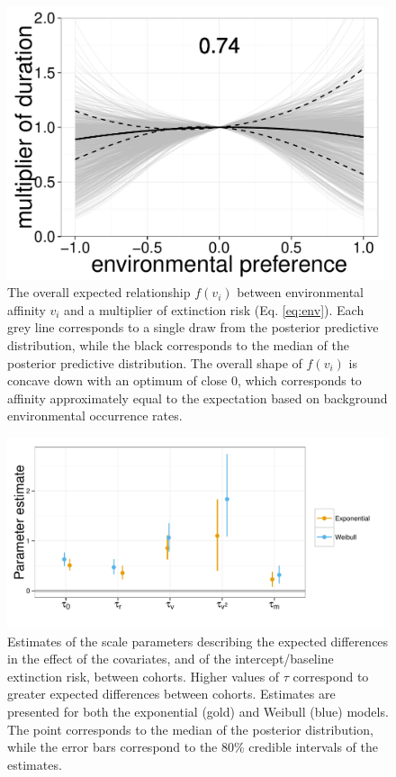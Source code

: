 \documentclass[12pt,letterpaper]{article}
\begin{document}
\begin{figure}[ht]
  \centering
  \includegraphics[height = 0.5\textheight,width=\textwidth,keepaspectratio=true]{figure/environ_quad}
  \caption{The overall expected relationship \(f(v_{i})\) between environmental affinity \(v_{i}\) and a multiplier of extinction risk (Eq. \ref{eq:env}). Each grey line corresponds to a single draw from the posterior predictive distribution, while the black corresponds to the median of the posterior predictive distribution. The overall shape of \(f(v_{i})\) is concave down with an optimum of close 0, which corresponds to affinity approximately equal to the expectation based on background environmental occurrence rates.}
  \label{fig:env_mean}
\end{figure}

\begin{figure}[ht]
  \centering
  \includegraphics[height = 0.5\textheight,width=\textwidth,keepaspectratio=true]{figure/coef_var}
  \caption{Estimates of the scale parameters describing the expected differences in the effect of the covariates, and of the intercept/baseline extinction risk, between cohorts. Higher values of \(\tau\) correspond to greater expected differences between cohorts. Estimates are presented for both the exponential (gold) and Weibull (blue) models. The point corresponds to the median of the posterior distribution, while the error bars correspond to the 80\% credible intervals of the estimates.}
  \label{fig:tau}
\end{figure}
\end{document}
